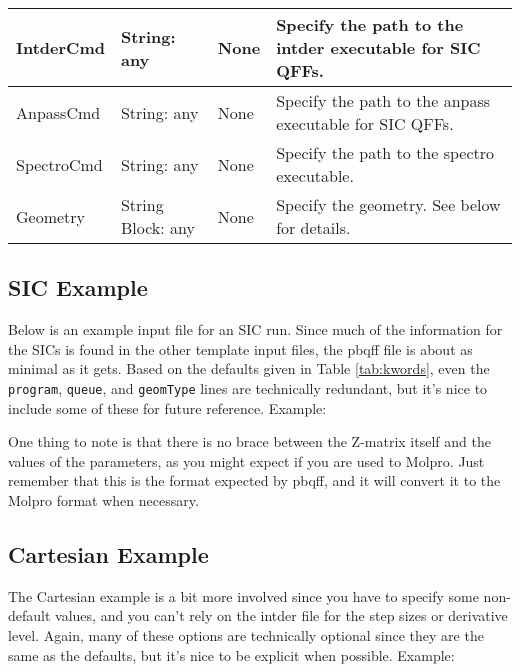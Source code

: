 \documentclass{article}
\begin{document}
\begin{table}[ht]
\begin{tabular}{|l|>{\raggedright}p{}|l|p{}|}
    \hline
    IntderCmd                     & String: any & None & Specify the path to the intder executable for SIC QFFs.\\
    \hline
    AnpassCmd                     & String: any & None & Specify the path to the anpass executable for SIC QFFs.\\
    \hline
    SpectroCmd                    & String: any & None & Specify the path to the spectro executable.\\
    \hline
    Geometry                      & String Block: any & None & Specify the geometry. See below for details.\\
    \hline
  \end{tabular}
\end{table}

\subsection{SIC Example}

Below is an example input file for an SIC run. Since much of the
information for the SICs is found in the other template input files,
the pbqff file is about as minimal as it gets. Based on the defaults
given in Table \ref{tab:kwords}, even the \verb|program|,
\verb|queue|, and \verb|geomType| lines are technically redundant, but
it's nice to include some of these for future reference. Example:



One thing to note is that there is no brace between the Z-matrix
itself and the values of the parameters, as you might expect if you
are used to Molpro. Just remember that this is the format expected by
pbqff, and it will convert it to the Molpro format when necessary.

\subsection{Cartesian Example}

The Cartesian example is a bit more involved since you have to specify
some non-default values, and you can't rely on the intder file for the
step sizes or derivative level. Again, many of these options are
technically optional since they are the same as the defaults, but it's
nice to be explicit when possible. Example:


\end{document}
